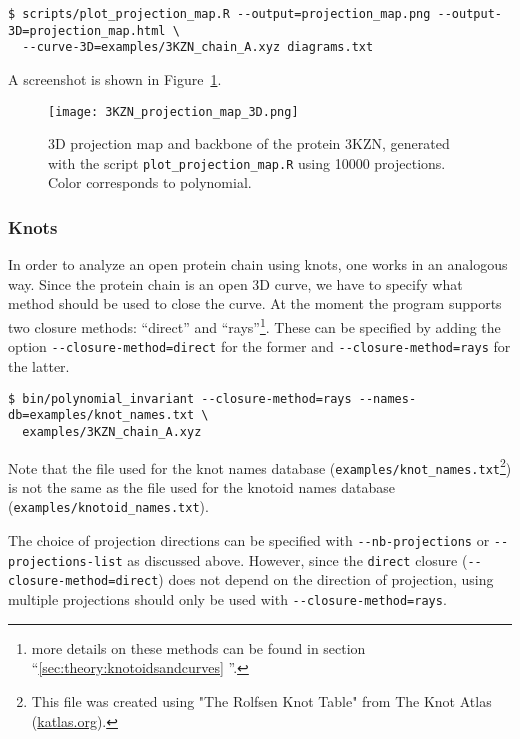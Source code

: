 \begin{lstlisting}
$ scripts/plot_projection_map.R --output=projection_map.png --output-3D=projection_map.html \
  --curve-3D=examples/3KZN_chain_A.xyz diagrams.txt
\end{lstlisting}
A screenshot is shown in Figure~\ref{fig:3KZN:projectionmap:3D}.
\begin{figure}[t]
\centering
\texttt{[image: 3KZN\_projection\_map\_3D.png]}
\caption{3D projection map and backbone of the protein 3KZN, generated with the script \lstinline{plot_projection_map.R} using 10000 projections. Color corresponds to polynomial.}\label{fig:3KZN:projectionmap:3D}
\end{figure}


\subsubsection{Knots}
In order to analyze an open protein chain using knots, one works in an analogous way. Since the protein chain is an open 3D curve, we have to specify what method should be used to close the curve. At the moment the program supports two closure methods: ``direct'' and ``rays''\footnote{more details on these methods can be found in section ``\ref{sec:theory:knotoidsandcurves} ''.}. These can be specified by adding the option \lstinline{--closure-method=direct} for the former and \lstinline{--closure-method=rays} for the latter.
\begin{lstlisting}
$ bin/polynomial_invariant --closure-method=rays --names-db=examples/knot_names.txt \
  examples/3KZN_chain_A.xyz
\end{lstlisting}
Note that the file used for the knot names database (\lstinline{examples/knot_names.txt}\footnote{This file was created using "The Rolfsen Knot Table" from The Knot Atlas (\url{katlas.org}).}) is not the same as the file used for the knotoid names database (\lstinline{examples/knotoid_names.txt}).

The choice of projection directions can be specified with \lstinline{--nb-projections} or \lstinline{--projections-list} as discussed above. However, since the \lstinline{direct} closure (\lstinline{--closure-method=direct}) does not depend on the direction of projection, using multiple projections should only be used with \lstinline{--closure-method=rays}.

